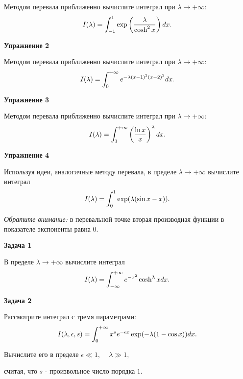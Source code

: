 \documentclass[a4paper,12pt]{article}
\begin{document}
\noindent Методом перевала приближенно вычислите интеграл при $\lambda\rightarrow+\infty$:
\begin{equation}
I(\lambda)=\int_{-1}^{1}\exp\left(\frac{\lambda}{\cosh^{2}x}\right)dx\text{.}	
\notag
\end{equation}

\vspace{15pt}
\noindent \textbf{Упражнение 2}

\noindent Методом перевала приближенно вычислите интеграл при $\lambda\rightarrow+\infty$:
\begin{equation}\notag
I(\lambda)	=\int_{0}^{+\infty}e^{-\lambda(x-1)^{2}(x-2)^{2}}dx.
\end{equation}

\vspace{15pt}
\noindent \textbf{Упражнение 3}

\noindent Методом перевала приближенно вычислите интеграл при $\lambda\rightarrow+\infty$:
\begin{equation}\notag
I(\lambda)=\int_{1}^{+\infty}\left(\frac{\ln x}{x}\right)^{\lambda}dx.	
\end{equation}

\vspace{15pt}
\noindent \textbf{Упражнение 4}

\noindent Используя идеи, аналогичные методу перевала, в пределе $\lambda\rightarrow+\infty$ вычислите интеграл
\begin{equation}\notag
I(\lambda)	=\int_{0}^{1}\exp(\lambda(\sin x-x)).
\end{equation}

\noindent \textit{Обратите внимание:} в перевальной точке вторая производная функции в показателе экспоненты равна 0.

\vspace{15pt}
\noindent \textbf{Задача 1}

\noindent В пределе $\lambda\rightarrow+\infty$ вычислите интеграл
\begin{equation}\notag
I(\lambda)	=\int_{-\infty}^{+\infty}e^{-x^{2}}\cosh^{\lambda}xdx.
\end{equation}

\vspace{15pt}
\noindent \textbf{Задача 2}

\noindent Рассмотрите интеграл с тремя параметрами:
\begin{equation}\notag
I(\lambda,\epsilon,s)	=\int_{0}^{+\infty}x^{s}e^{-\epsilon x}\exp(-\lambda(1-\cos x))dx.
\end{equation}

\noindent Вычислите его в пределе $\epsilon	\ll 1$, $\quad\lambda\gg1$,

\noindent считая, что $s$ - произвольное число порядка $1$.
\end{document}
